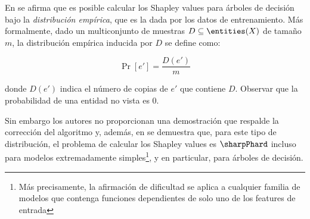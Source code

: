 En \cite{lundberg2020local} se afirma que es posible calcular los Shapley values para árboles de decisión bajo la \textit{distribución empírica}, que es la dada por los datos de entrenamiento. Más formalmente, dado un multiconjunto de muestras \(D \subseteq \entities(X)\) de tamaño \(m\), la distribución empírica inducida por \(D\) se define como:

\[
\Pr[e'] = \frac{D(e')}{m} 
\]

donde \(D(e')\) indica el número de copias de \(e'\) que contiene \(D\). Observar que la probabilidad de una entidad no vista es 0.

Sin embargo los autores no proporcionan una demostración que respalde la corrección del algoritmo y, además, en \cite{van2022tractability} se demuestra que, para este tipo de distribución, el problema de calcular los Shapley values es \(\sharpPhard\) incluso para modelos extremadamente simples\footnote{Más precisamente, la afirmación de dificultad se aplica a cualquier familia de modelos que contenga funciones dependientes de solo uno de los features de entrada}, y en particular, para árboles de decisión.

\begin{comment}
	Sacó esto de acá porque literal menciono lo mismo acá: "En \cite{van2022tractability}, se demostró que...", además era NP-Hard, no #P-Hard
	
	Por último, en \cite{van2022tractability} también se demuestra que el problema es \(\sharpPhard\) al considerar el modelo trivial \(f(x_1,\ldots,x_n) = x_1\) y una distribución Naive Bayes. Una distribución Naive Bayes asume que los features son independientes entre sí, dado el valor de la variable objetivo. \sergio{trataría de explicar un poco más o dar un ejemplito}\santi{Aparte, creo que la definición en ese contexto no es esta. Ellos tienen una red bayesiana que modela las correlaciones entre los features. Por otro lado completamente distinto está el valor del modelo con una cierta entrada. El punto es que una red naive bayes es básicamente dos distribuciones independientes, moduladas por una única feature de la cual depende qué indpendiente se usa.}
\end{comment}


\begin{comment}
	Matemáticamente, esto se representa como 
	\[
	P(X_1, X_2, \ldots, X_n | Y) = \prod_{i=1}^n P(X_i | Y)
	\]    
\end{comment}

